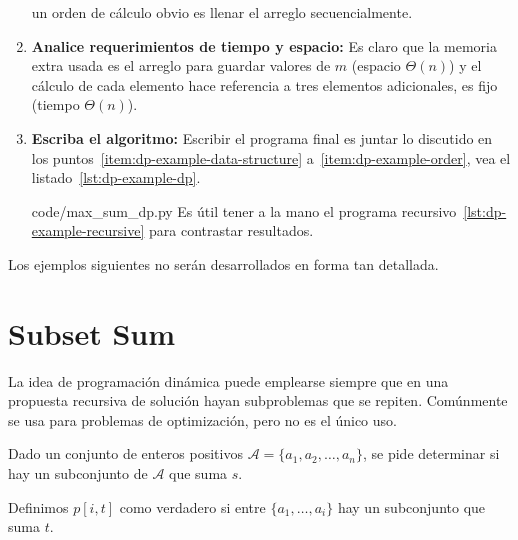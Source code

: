 \begin{enumerate}[label = {(\alph*)}]
    un orden de cálculo obvio es llenar el arreglo secuencialmente.
  \item \textbf{Analice requerimientos de tiempo y espacio:}
    \label{item:dp-example-analysis}
    Es claro que la memoria extra usada
    es el arreglo para guardar valores de \(m\)
    (espacio \(\Theta(n)\))
    y el cálculo de cada elemento hace referencia a tres elementos adicionales,
    es fijo
    (tiempo \(\Theta(n)\)).
  \item \textbf{Escriba el algoritmo:}
    Escribir el programa final
    es juntar lo discutido en los puntos~\ref{item:dp-example-data-structure}
    a~\ref{item:dp-example-order},
    vea el listado~\ref{lst:dp-example-dp}.
    \label{item:dp-example-algorithm}
    
		    {code/max_sum_dp.py}
    Es útil tener a la mano
    el programa recursivo~\ref{lst:dp-example-recursive}
    para contrastar resultados.
  \end{enumerate}
  Los ejemplos siguientes no serán desarrollados en forma tan detallada.

\section{Subset Sum}
\label{sec:SubsetSum}

  La idea de programación dinámica
  puede emplearse siempre que en una propuesta recursiva de solución
  hayan subproblemas que se repiten.
  Comúnmente se usa para problemas de optimización,
  pero no es el único uso.

  Dado un conjunto de enteros positivos
  \(\mathscr{A} = \{ a_1, a_2, \dotsc, a_n \}\),
  se pide determinar si hay un subconjunto de \(\mathscr{A}\) que suma \(s\).

  Definimos \(p[i, t]\) como verdadero
  si entre \(\{a_1, \dotsc, a_i\}\) hay un subconjunto que suma \(t\).

